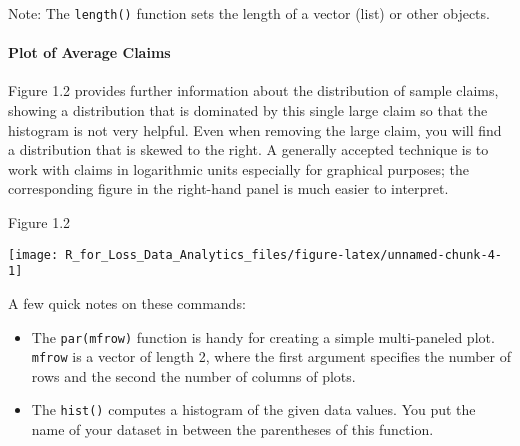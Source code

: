 \documentclass[]{book}
\newenvironment{Shaded}{\begin{snugshade}}{\end{snugshade}}
\newcommand{\KeywordTok}[1]{\textcolor[rgb]{0.13,0.29,0.53}{\textbf{#1}}}
\newcommand{\DataTypeTok}[1]{\textcolor[rgb]{0.13,0.29,0.53}{#1}}
\newcommand{\DecValTok}[1]{\textcolor[rgb]{0.00,0.00,0.81}{#1}}
\newcommand{\StringTok}[1]{\textcolor[rgb]{0.31,0.60,0.02}{#1}}
\newcommand{\OperatorTok}[1]{\textcolor[rgb]{0.81,0.36,0.00}{\textbf{#1}}}
\newcommand{\NormalTok}[1]{#1}
\let\oldparagraph\paragraph
\renewcommand{\paragraph}[1]{\oldparagraph{#1}\mbox{}}
\theoremstyle{definition}
\theoremstyle{definition}
\theoremstyle{definition}
\theoremstyle{remark}
\begin{document}
Note: The \texttt{length()} function sets the length of a vector (list)
or other objects.

\paragraph{Plot of Average Claims}\label{plot-of-average-claims}

Figure 1.2 provides further information about the distribution of sample
claims, showing a distribution that is dominated by this single large
claim so that the histogram is not very helpful. Even when removing the
large claim, you will find a distribution that is skewed to the right. A
generally accepted technique is to work with claims in logarithmic units
especially for graphical purposes; the corresponding figure in the
right-hand panel is much easier to interpret.

Figure 1.2

\begin{Shaded}
\end{Shaded}

\begin{center}\texttt{[image: R\_for\_Loss\_Data\_Analytics\_files/figure-latex/unnamed-chunk-4-1]} \end{center}

A few quick notes on these commands:

\begin{itemize}
\item
  The \texttt{par(mfrow)} function is handy for creating a simple
  multi-paneled plot. \texttt{mfrow} is a vector of length 2, where the
  first argument specifies the number of rows and the second the number
  of columns of plots.
\item
  The \texttt{hist()} computes a histogram of the given data values. You
  put the name of your dataset in between the parentheses of this
  function.
\end{itemize}
\end{document}
